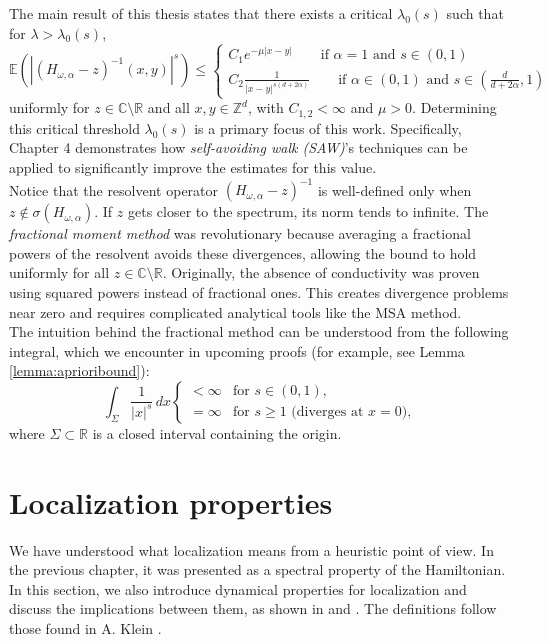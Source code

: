 \documentclass[11pt, a4paper, UKenglish, oneside]{book}
\theoremstyle{plain}
\theoremstyle{remark}
\theoremstyle{definition}
\numberwithin{equation}{section}
\numberwithin{theorem}{section}
\begin{document}
The main result of this thesis states that there exists a critical $\lambda_0(s)$ such that for $\lambda > \lambda_{0}(s)$,
\begin{equation}
    \mathbb{E}\left( |(H_{\omega,\alpha} - z)^{-1}(x,y)|^s \right) \le
    \begin{cases}
        C_1 e^{-\mu |x-y|} \qquad \text{if } \alpha =1 \text{ and } s \in (0,1)\\
        C_2 \frac{1}{|x-y|^{s(d+2\alpha)}} \qquad \text{if } \alpha \in (0,1) \text{ and } s \in (\frac{d}{d+2\alpha},1)
    \end{cases} 
\end{equation}
uniformly for $z \in \mathbb{C} \setminus \mathbb{R}$ and all $x,y \in \mathbb{Z}^d$, with $C_{1,2} < \infty$ and $\mu> 0$. Determining this critical threshold $\lambda_0(s)$ is a primary focus of this work. Specifically, Chapter 4 demonstrates how \textit{self-avoiding walk (SAW)}'s techniques can be applied to significantly improve the estimates for this value. \\

Notice that the resolvent operator $(H_{\omega,\alpha} - z)^{-1}$ is well-defined only when $z \notin \sigma(H_{\omega,\alpha})$. If $z$ gets closer to the spectrum, its norm tends to infinite. The \textit{fractional moment method} was revolutionary because averaging a fractional powers of the resolvent avoids these divergences, allowing the bound to hold uniformly for all $z \in \mathbb{C} \setminus \mathbb{R}$.
Originally, the absence of conductivity was proven using squared powers instead of fractional ones. This creates divergence problems near zero and requires complicated analytical tools like the MSA method. \\

The intuition behind the fractional method can be understood from the following integral, which we encounter in upcoming proofs (for example, see Lemma \ref{lemma:aprioribound}):
\[
\int_{\Sigma} \frac{1}{|x|^s} \, dx 
\begin{cases} 
    < \infty & \text{for } s \in (0,1), \\ 
    = \infty & \text{for } s \ge 1 \text{ (diverges at } x=0),
\end{cases} 
\]
where $\Sigma \subset \mathbb{R}$ is a closed interval containing the origin.\\


\clearpage
\chapter{Localization properties}
We have understood what localization means from a heuristic point of view. In the previous chapter, it was presented as a spectral property of the Hamiltonian. In this section, we also introduce dynamical properties for localization and discuss the implications between them, as shown in \cite{stolz2011} and \cite{hundertmark2007}. The definitions follow those found in A. Klein \cite{klein2007}.
\end{document}
